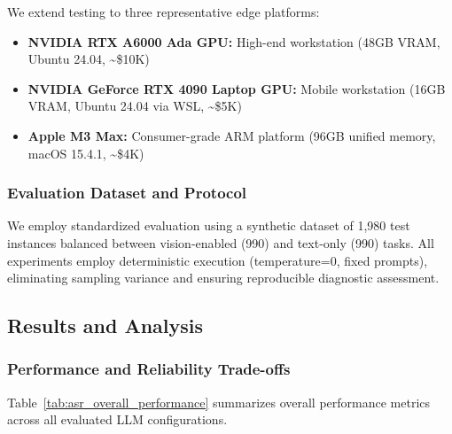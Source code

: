 We extend testing to three representative edge platforms:

\begin{itemize}[leftmargin=*]
    \item \textbf{NVIDIA RTX A6000 Ada GPU:} High-end workstation (48GB VRAM, Ubuntu 24.04, \textasciitilde\$10K)
    \item \textbf{NVIDIA GeForce RTX 4090 Laptop GPU:} Mobile workstation (16GB VRAM, Ubuntu 24.04 via WSL, \textasciitilde\$5K)
    \item \textbf{Apple M3 Max:} Consumer-grade ARM platform (96GB unified memory, macOS 15.4.1, \textasciitilde\$4K)
\end{itemize}

\subsubsection{Evaluation Dataset and Protocol}

We employ standardized evaluation using a synthetic dataset of 1,980 test instances balanced between vision-enabled (990) and text-only (990) tasks. All experiments employ deterministic execution (temperature=0, fixed prompts), eliminating sampling variance and ensuring reproducible diagnostic assessment.

\subsection{Results and Analysis}

\subsubsection{Performance and Reliability Trade-offs}

Table~\ref{tab:asr_overall_performance} summarizes overall performance metrics across all evaluated LLM configurations.

